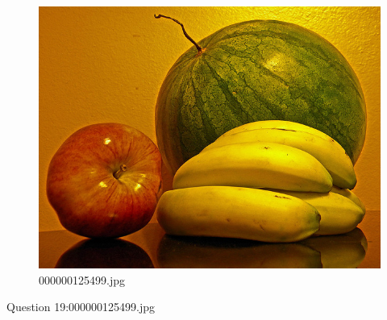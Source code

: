     \begin{figure}[h]
        \centering
        \includegraphics[width=0.8\linewidth]{../image set/easy/000000125499.jpg}
        \caption{000000125499.jpg}
    \end{figure}
    Question 19:000000125499.jpg
